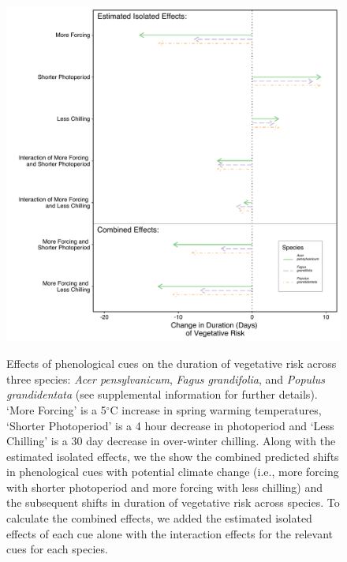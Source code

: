 \documentclass{article}\usepackage[]{graphicx}\usepackage[]{color}
\begin{document}
\begin{figure} [H] 
 \begin{center}
 \includegraphics[width=12cm, height=12cm]{..//figure/Exp_plotTPS.pdf} 
 \caption{Effects of phenological cues on the duration of vegetative risk across three species: \textit{Acer pensylvanicum}, \textit{Fagus grandifolia}, and \textit{Populus grandidentata} (see supplemental information for further details). `More Forcing' is a 5$^{\circ}$C increase in spring warming temperatures, `Shorter Photoperiod' is a 4 hour decrease in photoperiod and `Less Chilling' is a 30 day decrease in over-winter chilling. Along with the estimated isolated effects, we the show the combined predicted shifts in phenological cues with potential climate change (i.e., more forcing with shorter photoperiod and more forcing with less chilling) and the subsequent shifts in duration of vegetative risk across species. To calculate the combined effects, we added the estimated isolated effects of each cue alone with the interaction effects for the relevant cues for each species.}\label{fig:dan} 
 \end{center}
 \end{figure}


\end{document}

